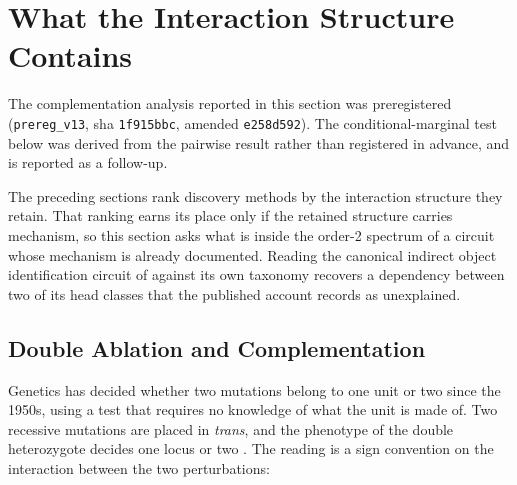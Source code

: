 \documentclass{article}
\begin{document}
%

\section{What the Interaction Structure Contains}
\label{sec:what-epistasis-contains}

The complementation analysis reported in this section was preregistered (\texttt{prereg\_v13}, sha \texttt{1f915bbc}, amended \texttt{e258d592}). The conditional-marginal test below was derived from the pairwise result rather than registered in advance, and is reported as a follow-up.

The preceding sections rank discovery methods by the interaction structure they retain.
That ranking earns its place only if the retained structure carries mechanism, so this
section asks what is inside the order-2 spectrum of a circuit whose mechanism is already
documented. Reading the canonical indirect object identification circuit of
\citet{wang2022ioi} against its own taxonomy recovers a dependency between two of its head
classes that the published account records as unexplained.

\subsection{Double Ablation and Complementation}

Genetics has decided whether two mutations belong to one unit or two since the 1950s, using
a test that requires no knowledge of what the unit is made of. Two recessive mutations are
placed in \emph{trans}, and the phenotype of the double heterozygote decides one locus or
two \citep{benzer1955}. The reading is a sign convention on the interaction between the two
perturbations:
\end{document}
